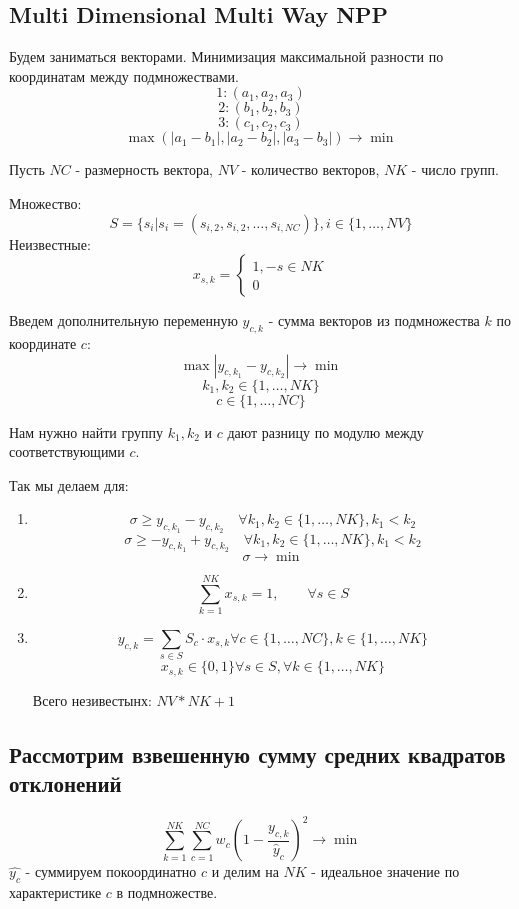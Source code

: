 \documentclass[%
10pt, %
final, %
oneside, %
onecolumn, %
centertags]{article} %
\theoremstyle{plain}
\theoremstyle{definition}
\theoremstyle{remark}
\begin{document}
\subsection{Multi Dimensional Multi Way NPP}

Будем заниматься векторами. Минимизация максимальной разности по координатам между подмножествами.
$$1: (a_1,a_2,a_3)$$
$$2: (b_1,b_2,b_3)$$
$$3: (c_1,c_2,c_3)$$
$$\max (|a_1-b_1|, |a_2-b_2|,|a_3-b_3|) \to \min$$

Пусть $NC$ - размерность вектора, $NV$ - количество векторов, $NK$ - число групп.

Множество:
$$S = \{s_i \vert s_i = (s_{i,2},s_{i,2},\ldots,s_{i,NC})\}, i \in \{1,\ldots,NV\}$$
Неизвестные:
$$x_{s,k} = \begin{cases}
	1, - s \in NK \\
	0 
\end{cases}$$

Введем дополнительную переменную $y_{c,k}$ - сумма векторов из подмножества $k$ по координате $c$:
$$\max |y_{c,k_1} - y_{c,k_2}| \to \min$$
$$k_1,k_2 \in \{1,\ldots, NK\}$$
$$c \in \{1,\ldots,NC\}$$

Нам нужно найти группу $k_1,k_2$ и $c$ дают разницу по модулю между соответствующими $c$.

Так мы делаем для:
\begin{enumerate}
	\item $$\sigma \geq  y_{c,k_1} - y_{c,k_2}  \quad \forall k_1,k_2 \in \{1,\ldots,NK\}, k_1 < k_2$$
			$$\sigma \geq -y_{c,k_1} + y_{c,k_2} \quad \forall k_1,k_2 \in \{1,\ldots,NK\}, k_1 < k_2$$
			$$\sigma \to \min$$
	\item $$\sum\limits_{k=1}^{NK} x_{s,k} = 1, \qquad \forall s \in S$$ 
	\item $$y_{c,k} = \sum\limits_{s\in S} S_c \cdot x_{s,k} \forall c \in \{1,\ldots,NC\}, k \in\{1,\ldots,NK\}$$
	$$x_{s,k} \in \{0,1\} \forall s \in S, \forall k \in \{1,\ldots,NK\}$$

	Всего незивестынх: $NV*NK +1$
\end{enumerate}

\subsection{Рассмотрим взвешенную сумму средних квадратов отклонений}
$$\sum\limits_{k=1}^{NK}\sum\limits_{c=1}^{NC}w_c\left(1-\frac{y_{c,k}}{\hat{y}_c}\right)^2 \to \min$$
$\hat{y_c}$ - суммируем покоординатно $c$ и делим на $NK$ - идеальное значение по характеристике $c$ в подмножестве.
\end{document}
